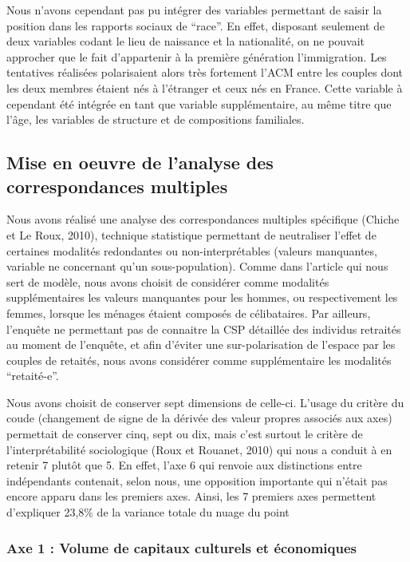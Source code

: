 \documentclass[
  12pt,
]{book}
\begin{document}
Nous n'avons cependant pas pu intégrer des variables permettant de
saisir la position dans les rapports sociaux de ``race''. En effet,
disposant seulement de deux variables codant le lieu de naissance et la
nationalité, on ne pouvait approcher que le fait d'appartenir à la
première génération l'immigration. Les tentatives réalisées polarisaient
alors très fortement l'ACM entre les couples dont les deux membres
étaient nés à l'étranger et ceux nés en France. Cette variable à
cependant été intégrée en tant que variable supplémentaire, au même
titre que l'âge, les variables de structure et de compositions
familiales.

\subsection{Mise en oeuvre de l'analyse des correspondances
multiples}\label{mise-en-oeuvre-de-lanalyse-des-correspondances-multiples}

Nous avons réalisé une analyse des correspondances multiples spécifique
(Chiche et Le Roux, 2010), technique statistique permettant de
neutraliser l'effet de certaines modalités redondantes ou
non-interprétables (valeurs manquantes, variable ne concernant qu'un
sous-population). Comme dans l'article qui nous sert de modèle, nous
avons choisit de considérer comme modalités supplémentaires les valeurs
manquantes pour les hommes, ou respectivement les femmes, lorsque les
ménages étaient composés de célibataires. Par ailleurs, l'enquête ne
permettant pas de connaitre la CSP détaillée des individus retraités au
moment de l'enquête, et afin d'éviter une sur-polarisation de l'espace
par les couples de retaités, nous avons considérer comme supplémentaire
les modalités ``retaité-e''.

Nous avons choisit de conserver sept dimensions de celle-ci. L'usage du
critère du coude (changement de signe de la dérivée des valeur propres
associés aux axes) permettait de conserver cinq, sept ou dix, mais c'est
surtout le critère de l'interprétabilité sociologique (Roux et Rouanet,
2010) qui nous a conduit à en retenir 7 plutôt que 5. En effet, l'axe 6
qui renvoie aux distinctions entre indépendants contenait, selon nous,
une opposition importante qui n'était pas encore apparu dans les
premiers axes. Ainsi, les 7 premiers axes permettent d'expliquer 23,8\%
de la variance totale du nuage du point

\subsubsection{Axe 1 : Volume de capitaux culturels et
économiques}\label{axe-1-volume-de-capitaux-culturels-et-uxe9conomiques}
\end{document}
